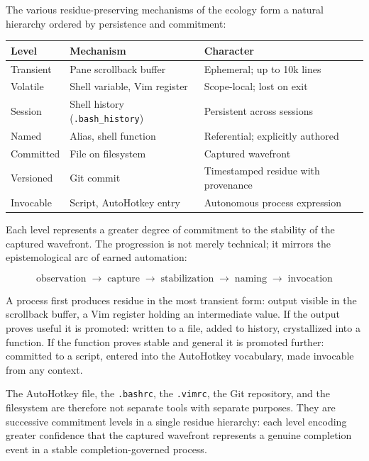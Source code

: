 \documentclass[12pt, a4paper]{article}
\begin{document}
The various residue-preserving mechanisms of the ecology form
a natural hierarchy ordered by persistence and commitment:

\begin{center}
\begin{tabular}{lll}
\textbf{Level} & \textbf{Mechanism} & \textbf{Character} \\
\hline
Transient & Pane scrollback buffer & Ephemeral; up to 10k lines \\
Volatile & Shell variable, Vim register & Scope-local; lost on exit \\
Session & Shell history (\texttt{.bash\_history}) & Persistent across sessions \\
Named & Alias, shell function & Referential; explicitly authored \\
Committed & File on filesystem & Captured wavefront \\
Versioned & Git commit & Timestamped residue with provenance \\
Invocable & Script, AutoHotkey entry & Autonomous process expression \\
\end{tabular}
\end{center}

Each level represents a greater degree of commitment to the
stability of the captured wavefront. The progression is not
merely technical; it mirrors the epistemological arc of earned
automation:

\[
\text{observation}
\;\to\;
\text{capture}
\;\to\;
\text{stabilization}
\;\to\;
\text{naming}
\;\to\;
\text{invocation}
\]

A process first produces residue in the most transient form:
output visible in the scrollback buffer, a Vim register holding
an intermediate value. If the output proves useful it is
promoted: written to a file, added to history, crystallized
into a function. If the function proves stable and general
it is promoted further: committed to a script, entered into
the AutoHotkey vocabulary, made invocable from any context.

The AutoHotkey file, the \texttt{.bashrc}, the \texttt{.vimrc},
the Git repository, and the filesystem are therefore not separate
tools with separate purposes. They are successive commitment
levels in a single residue hierarchy: each level encoding
greater confidence that the captured wavefront represents a
genuine completion event in a stable completion-governed process.

\end{document}

